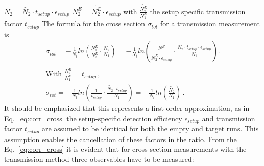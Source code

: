 $N_{2} = \tilde{N_{2}} \cdot t_{setup}\cdot \epsilon_{setup}$\newline
$N_{2}^E = \tilde{N_{2}^E} \cdot \epsilon_{setup}$ with $\frac{\tilde{N_{2}^E}}{N_{1}^E}$ the setup specific transmission factor $t_{setup}$ \newline
\newline
The formula for the cross section $\sigma_{tot}$ for a transmission measurement is
\begin{equation}
	\begin{split}
\sigma_{tot} = -\frac{1}{N_t} ln(\frac{N_{1}^E}{N_{2}^E} \cdot \frac{N_2}{N_1}) = -\frac{1}{N_t} ln(\frac{N_{1}^E}{\tilde{N_{2}^E} \cdot \epsilon_{setup}} \cdot \frac{\tilde{N_{2}} \cdot t_{setup} \cdot \epsilon_{setup}}{N_1}). \\
\text{With $\frac{\tilde{N_{2}^E}}{N_{1}^E} = t_{setup}$} \, ,\\
\sigma_{tot} = -\frac{1}{N_t} ln(\frac{1}{t_{setup}} \cdot \frac{\tilde{N_{2}} \cdot t_{setup}}{N_1}) = -\frac{1}{N_t} ln(\frac{\tilde{N_{2}}}{N_1}) \, .
\label{eq:corr_cross}
	\end{split}
\end{equation}
It should be emphasized that this represents a first-order approximation, as in Eq.~\ref{eq:corr_cross} the setup-specific detection efficiency $\epsilon_{setup}$ and transmission factor $t_{setup}$ are assumed to be identical for both the empty and target runs. This assumption enables the cancellation of these factors in the ratio.\newline
From the Eq.~\ref{eq:corr_cross} it is evident that for cross section measurements with the transmission method three observables have to be measured:\newline
